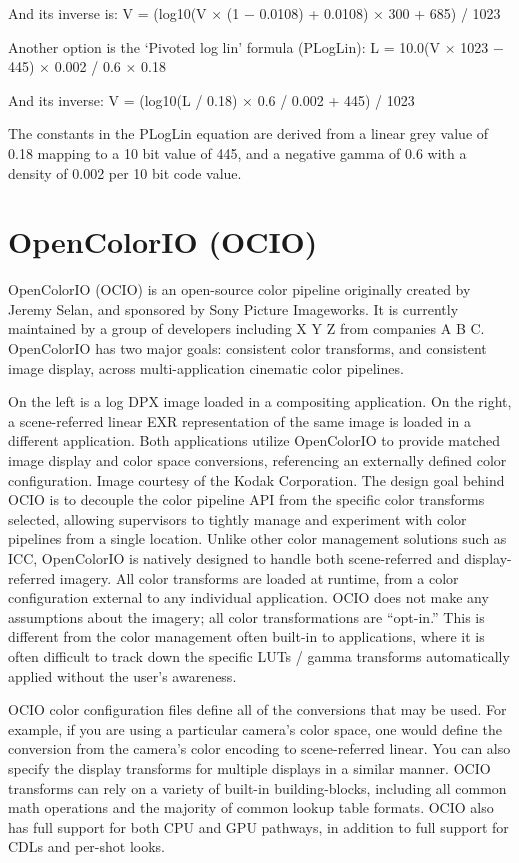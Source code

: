 And its inverse is:
	V = (log10(V × (1 − 0.0108) + 0.0108) × 300 + 685) / 1023

Another option is the ‘Pivoted log lin’ formula (PLogLin):
	L = 10.0(V × 1023 − 445) × 0.002 / 0.6 × 0.18



And its inverse:
	V = (log10(L / 0.18) × 0.6 / 0.002 + 445) / 1023

The constants in the PLogLin equation are derived from a linear grey value of 0.18 mapping to a 10 bit value of 445, and a negative gamma of 0.6 with a density of 0.002 per 10 bit code value.

\section{OpenColorIO (OCIO)}

OpenColorIO (OCIO) is an open-source color pipeline originally created by Jeremy Selan, and sponsored by Sony Picture Imageworks. It is currently maintained by a group of developers including X Y Z from companies A B C. OpenColorIO has two major goals: consistent color transforms, and consistent image display, across multi-application cinematic color pipelines.

On the left is a log DPX image loaded in a compositing application. On the right, a scene-referred linear EXR representation of the same image is loaded in a different application. Both applications utilize OpenColorIO to provide matched image display and color space conversions, referencing an externally defined color configuration. Image courtesy of the Kodak Corporation.
The design goal behind OCIO is to decouple the color pipeline API from the specific color transforms selected, allowing supervisors to tightly manage and experiment with color pipelines from a single location. Unlike other color management solutions such as ICC, OpenColorIO is natively designed to handle both scene-referred and display-referred imagery. All color transforms are loaded at runtime, from a color configuration external to any individual application. OCIO does not make any assumptions about the imagery; all color transformations are “opt-in.” This is different from the color management often built-in to applications, where it is often difficult to track down the specific LUTs / gamma transforms automatically applied without the user’s awareness.

OCIO color configuration files define all of the conversions that may be used. For example, if you are using a particular camera’s color space, one would define the conversion from the camera’s color encoding to scene-referred linear. You can also specify the display transforms for multiple displays in a similar manner. OCIO transforms can rely on a variety of built-in building-blocks, including all common math operations and the majority of common lookup table formats. OCIO also has full support for both CPU and GPU pathways, in addition to full support for CDLs and per-shot looks.

